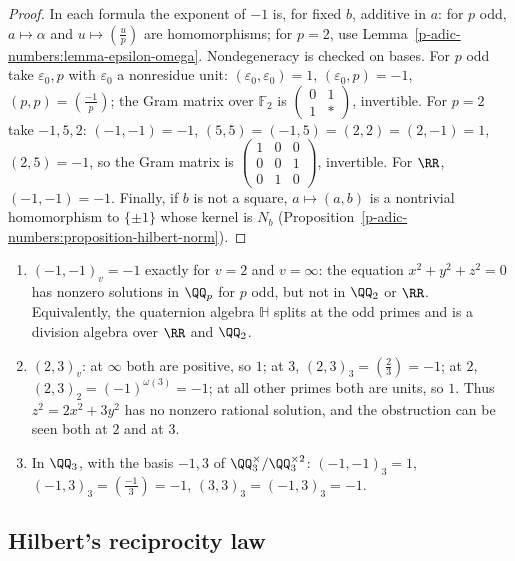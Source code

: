 \begin{proof}
In each formula the exponent of $-1$ is, for fixed $b$, additive in $a$: for $p$ odd, $a \mapsto \alpha$ and $u \mapsto (\frac up)$ are homomorphisms; for $p = 2$, use Lemma~\ref{p-adic-numbers:lemma-epsilon-omega}.
Nondegeneracy is checked on bases. For $p$ odd take $\varepsilon_0, p$ with $\varepsilon_0$ a nonresidue unit: $(\varepsilon_0, \varepsilon_0) = 1$, $(\varepsilon_0, p) = -1$, $(p, p) = (\frac{-1}{p})$; the Gram matrix over $\mathbb{F}_2$ is
$\left(\begin{smallmatrix}0 & 1\\ 1 & *\end{smallmatrix}\right)$, invertible. For $p = 2$ take $-1, 5, 2$: $(-1, -1) = -1$, $(5, 5) = (-1, 5) = (2, 2) = (2, -1) = 1$, $(2, 5) = -1$, so the Gram matrix is
$\left(\begin{smallmatrix}1 & 0 & 0\\ 0 & 0 & 1\\ 0 & 1 & 0\end{smallmatrix}\right)$, invertible. For $\RR$, $(-1, -1) = -1$. Finally, if $b$ is not a square, $a \mapsto (a, b)$ is a nontrivial homomorphism to $\{\pm1\}$
whose kernel is $N_b$ (Proposition~\ref{p-adic-numbers:proposition-hilbert-norm}).
\end{proof}

\begin{example}\label{p-adic-numbers:example-hilbert}
\begin{enumerate}
\item $(-1, -1)_v = -1$ exactly for $v = 2$ and $v = \infty$: the equation $x^2 + y^2 + z^2 = 0$ has nonzero solutions in $\QQ_p$ for $p$ odd, but not in $\QQ_2$ or $\RR$. Equivalently, the quaternion algebra
$\mathbb{H}$ splits at the odd primes and is a division algebra over $\RR$ and $\QQ_2$.
\item $(2, 3)_v$: at $\infty$ both are positive, so $1$; at $3$, $(2, 3)_3 = (\frac23) = -1$; at $2$, $(2, 3)_2 = (-1)^{\omega(3)} = -1$; at all other primes both are units, so $1$. Thus $z^2 = 2x^2 + 3y^2$ has no
nonzero rational solution, and the obstruction can be seen both at $2$ and at $3$.
\item In $\QQ_3$, with the basis $-1, 3$ of $\QQ_3^\times/\QQ_3^{\times2}$: $(-1, -1)_3 = 1$, $(-1, 3)_3 = (\frac{-1}{3}) = -1$, $(3, 3)_3 = (-1, 3)_3 = -1$.
\end{enumerate}
\end{example}

\subsection{Hilbert's reciprocity law}\label{p-adic-numbers:subsection-hilbert-reciprocity}

